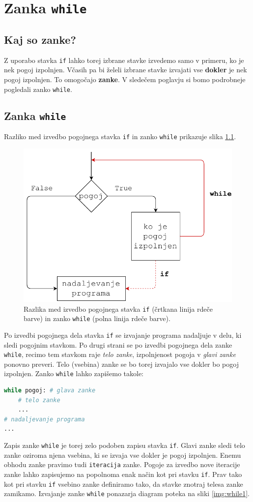 \chapter{Zanka \texttt{while}}

\section{Kaj so zanke?}

Z uporabo stavka \texttt{if} lahko torej izbrane stavke izvedemo samo v primeru, ko je nek pogoj izpolnjen. Včasih pa bi želeli izbrane stavke izvajati vse \textbf{dokler}  je nek pogoj izpolnjen. To omogočajo \textbf{zanke}. V sledečem poglavju si bomo podrobneje pogledali zanko \texttt{while}. 

\section{Zanka \texttt{while}}

Razliko med izvedbo pogojnega stavka \texttt{if} in zanko \texttt{while} prikazuje slika \ref{img:while_vs_if}.

\begin{figure}
    \centering
    \includegraphics[width=0.5\linewidth]{img/while_vs_if.pdf}
    \caption{Razlika med izvedbo pogojnega stavka \texttt{if} (črtkana linija rdeče barve) in zanko \texttt{while} (polna linija rdeče barve). }
    \label{img:while_vs_if}
\end{figure}
Po izvedbi pogojnega dela stavka \texttt{if} se izvajanje programa nadaljuje v delu, ki sledi pogojnim stavkom. Po drugi strani se po izvedbi pogojnega dela zanke \texttt{while}, recimo tem stavkom raje \emph{telo zanke}, izpolnjenost pogoja v \emph{glavi zanke} ponovno preveri. Telo (vsebina) zanke se bo torej izvajalo vse dokler bo pogoj izpolnjen. Zanko \texttt{while} lahko zapišemo takole:
\begin{lstlisting}[language=Python, showstringspaces=false]
while pogoj: # glava zanke
    # telo zanke
    ...
# nadaljevanje programa
...
\end{lstlisting}
Zapis zanke \texttt{while} je torej zelo podoben zapisu stavka \texttt{if}. Glavi zanke sledi telo zanke oziroma njena vsebina, ki se izvaja vse dokler je pogoj izpolnjen. Enemu obhodu zanke pravimo tudi \texttt{iteracija} zanke. Pogoje za izvedbo nove iteracije zanke lahko zapisujemo na popolnoma enak način kot pri stavku \texttt{if}. Prav tako kot pri stavku \texttt{if} vsebino zanke definiramo tako, da stavke znotraj telesa zanke zamikamo. Izvajanje zanke \texttt{while} ponazarja diagram poteka na sliki \ref{img:while1}.

